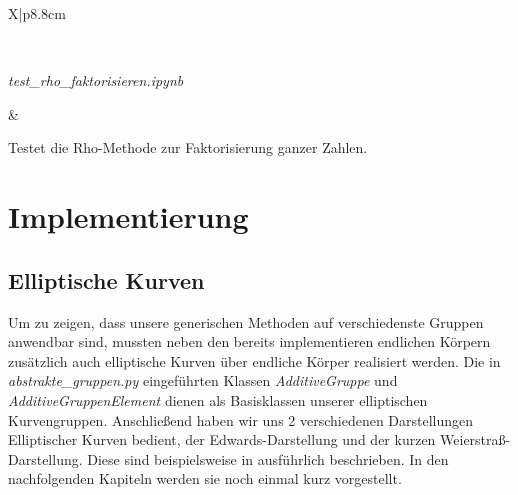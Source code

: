 \documentclass{scrartcl}
\begin{document}
\begin{table}[!ht]
\begin{tabularx}{\linewidth}{X|p{8.8cm}}
\begin{minipage}{\linewidth}
  \end{minipage} \\
  \hline
    \begin{minipage}{\linewidth}
    \emph{test\_rho\_faktorisieren.ipynb}
  \end{minipage} &
  \begin{minipage}{\linewidth}
      \vspace{2pt} Testet die Rho-Methode zur Faktorisierung ganzer Zahlen.   \vspace{2pt}
  \end{minipage}
\end{tabularx}
\renewcommand{\arraystretch}{1}
\caption{Übersicht der Jupyter Notebook Tests unserer Projektarbeit}
\label{tab:tests}
\end{table}


\section{Implementierung}
\label{sec:implementierung}

\subsection{Elliptische Kurven}
\label{sec:elliptische_kurven}

Um zu zeigen, dass unsere generischen Methoden auf verschiedenste Gruppen anwendbar sind, mussten neben den bereits implementieren endlichen Körpern zusätzlich auch elliptische Kurven über endliche Körper realisiert werden. 
Die in \emph{abstrakte\_gruppen.py} eingeführten Klassen \emph{AdditiveGruppe} und \emph{AdditiveGruppenElement} dienen als Basisklassen unserer elliptischen Kurvengruppen.
Anschließend haben wir uns 2 verschiedenen Darstellungen Elliptischer Kurven bedient, der Edwards-Darstellung und der kurzen Weierstraß-Darstellung. Diese sind beispielsweise in \cite{Galbraith2012} ausführlich beschrieben. In den nachfolgenden Kapiteln werden sie noch einmal kurz vorgestellt.
\end{document}
